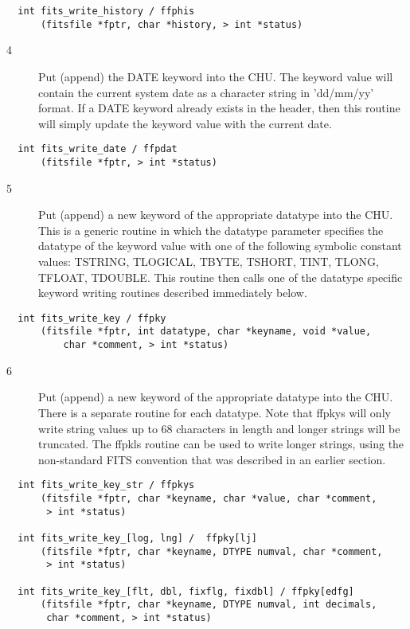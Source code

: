 \begin{verbatim}
  int fits_write_history / ffphis
      (fitsfile *fptr, char *history, > int *status)
\end{verbatim}

\begin{description}
\item[4 ] Put (append) the DATE keyword into the CHU.  The keyword value will contain
    the current system date as a character string in 'dd/mm/yy' format. If
    a DATE keyword already exists in the header, then this routine will
   simply update the keyword value with the current date.
\end{description}

\begin{verbatim}
  int fits_write_date / ffpdat
      (fitsfile *fptr, > int *status)
\end{verbatim}

\begin{description}
\item[5 ] Put (append) a new keyword of the appropriate datatype into the CHU.
    This is a generic routine in which
    the datatype parameter specifies the datatype of the keyword value
    with one of the following symbolic constant values:  TSTRING,
    TLOGICAL, TBYTE, TSHORT, TINT, TLONG, TFLOAT, TDOUBLE.  This
    routine then calls one of the datatype specific keyword writing
   routines described immediately below.
\end{description}

\begin{verbatim}
  int fits_write_key / ffpky
      (fitsfile *fptr, int datatype, char *keyname, void *value,
          char *comment, > int *status)
\end{verbatim}

\begin{description}
\item[6 ] Put (append) a new keyword of the appropriate datatype into the CHU.
    There is a separate routine for each datatype.
    Note that ffpkys will only write string values up to 68 characters in
    length and longer strings will be truncated.  The ffpkls routine can be
    used to write longer strings, using the non-standard FITS convention
   that was described in an earlier section.
\end{description}

\begin{verbatim}
  int fits_write_key_str / ffpkys
      (fitsfile *fptr, char *keyname, char *value, char *comment,
       > int *status)

  int fits_write_key_[log, lng] /  ffpky[lj]
      (fitsfile *fptr, char *keyname, DTYPE numval, char *comment,
       > int *status)

  int fits_write_key_[flt, dbl, fixflg, fixdbl] / ffpky[edfg]
      (fitsfile *fptr, char *keyname, DTYPE numval, int decimals,
       char *comment, > int *status)
\end{verbatim}

